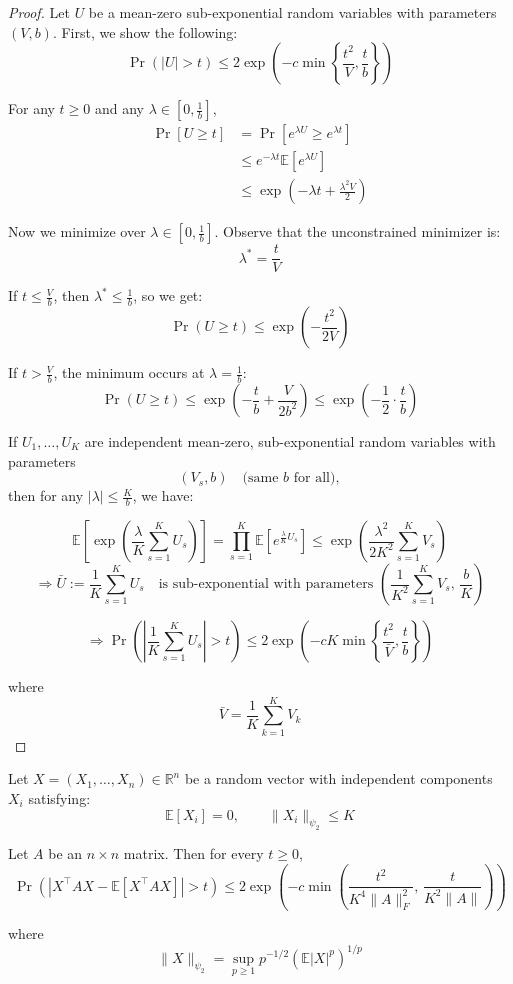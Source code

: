 \begin{proof}
Let $U$ be a mean-zero sub-exponential random variables with parameters $(V,b)$. First, we show the following:
    \[
\Pr(|U| > t) \leq 2 \exp\left( -c \min\left\{ \frac{t^2}{V}, \frac{t}{b} \right\} \right)
\]

For any $t \geq 0$ and any $\lambda \in \left[0, \frac{1}{b} \right]$,
\begin{align*}
\Pr[U \geq t] &= \Pr\left[ e^{\lambda U} \geq e^{\lambda t} \right] \\
&\leq e^{-\lambda t} \mathbb{E}[e^{\lambda U}] \\
&\leq \exp\left( -\lambda t + \frac{\lambda^2 V}{2} \right)
\end{align*}

Now we minimize over $\lambda \in \left[0, \frac{1}{b}\right]$.  
Observe that the unconstrained minimizer is: 
\[
\lambda^* = \frac{t}{V}
\]

If $t \leq \frac{V}{b}$, then $\lambda^* \leq \frac{1}{b}$, so we get:
\[
\Pr(U \geq t) \leq \exp\left( -\frac{t^2}{2V} \right)
\]

If $t > \frac{V}{b}$, the minimum occurs at $\lambda = \frac{1}{b}$:
\[
\Pr(U \geq t) \leq \exp\left( -\frac{t}{b} + \frac{V}{2b^2} \right)
\leq \exp\left( -\frac{1}{2} \cdot \frac{t}{b} \right)
\]

If $U_1, \ldots, U_K$ are independent mean-zero, sub-exponential random variables with parameters 
\[
(V_s, b) \quad \text{(same } b \text{ for all)}, 
\]
then for any $|\lambda| \leq \frac{K}{b}$, we have:

\[
\mathbb{E} \left[ \exp\left( \frac{\lambda}{K} \sum_{s=1}^K U_s \right) \right] 
= \prod_{s=1}^K \mathbb{E} \left[ e^{\frac{\lambda}{K} U_s} \right]
\leq \exp\left( \frac{\lambda^2}{2K^2} \sum_{s=1}^K V_s \right)
\]
 \[
\Rightarrow \bar{U} := \frac{1}{K} \sum_{s=1}^K U_s 
\quad \text{is sub-exponential with parameters } 
\left( \frac{1}{K^2} \sum_{s=1}^K V_s, \, \frac{b}{K} \right)
\]

\[
\Rightarrow \Pr\left( \left| \frac{1}{K} \sum_{s=1}^{K} U_s \right| > t \right) 
\leq 2 \exp\left( -cK \min\left\{ \frac{t^2}{\bar{V}}, \frac{t}{b} \right\} \right)
\]

where 
\[
\bar{V} = \frac{1}{K} \sum_{k=1}^{K} V_k
\]
\end{proof}

\begin{lemma}\label{lem:hanson-wright}
Let $X = (X_1, \ldots, X_n) \in \mathbb{R}^n$ be a random vector with independent components $X_i$ satisfying:
\[
\mathbb{E}[X_i] = 0, \qquad \|X_i\|_{\psi_2} \leq K
\]

Let $A$ be an $n \times n$ matrix. Then for every $t \geq 0$,
\[
\Pr\left( \left| X^\top A X - \mathbb{E}[X^\top A X] \right| > t \right) 
\leq 2 \exp\left( -c \min\left( \frac{t^2}{K^4 \|A\|_F^2}, \, \frac{t}{K^2 \|A\|} \right) \right)
\]

where
\[
\|X\|_{\psi_2} = \sup_{p \geq 1} p^{-1/2} \left( \mathbb{E}|X|^p \right)^{1/p}
\]
\end{lemma}

